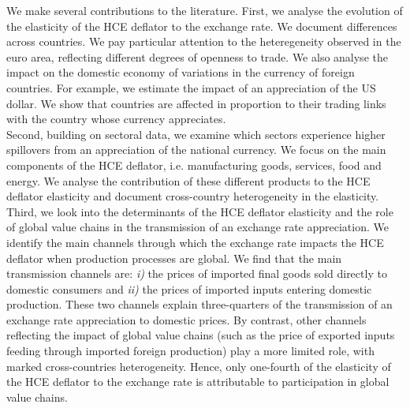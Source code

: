 \documentclass[11pt,a4paper]{paper} %
\begin{document}
We make several contributions to the literature. 
First, we analyse the evolution of the elasticity of the HCE deflator to the exchange rate. We document differences across countries.
We pay particular attention to the heteregeneity observed in the euro area, reflecting different degrees of openness to trade. 
We also analyse the impact on the domestic economy of variations in the currency of foreign countries. 
For example, we estimate the impact of an appreciation of the US dollar. 
We show that countries are affected in proportion to their trading links with the country whose currency appreciates. \\
Second, building on sectoral data, we examine which sectors experience higher spillovers from an appreciation of the national currency. 
We focus on the main components of the HCE deflator, i.e. manufacturing goods, services, food and energy. 
We analyse the contribution of these different products to the HCE deflator elasticity and document cross-country heterogeneity in the elasticity.\\
Third, we look into the determinants of the HCE deflator elasticity and the role of global value chains in the transmission of an exchange rate appreciation. 
We identify the main channels through which the exchange rate impacts the HCE deflator when production processes are global.
We find that the main transmission channels are:
\textit{i)} the prices of imported ﬁnal goods sold directly to domestic consumers and
\textit{ii)} the prices of imported inputs entering domestic production. 
These two channels explain three-quarters of the transmission of an exchange rate appreciation to domestic prices.
By contrast, other channels reflecting the impact of global value chains (such as the price of exported inputs feeding through imported foreign production) play a more limited role, with marked cross-countries heterogeneity.
Hence, only one-fourth of the elasticity of the HCE deflator to the exchange rate is attributable to participation in global value chains.\\
\end{document}
